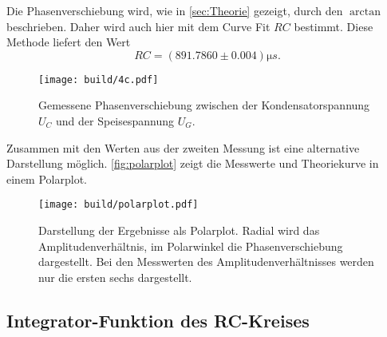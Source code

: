 Die Phasenverschiebung wird, wie in \autoref{sec:Theorie} gezeigt, durch den $\arctan$ beschrieben.
Daher wird auch hier mit dem Curve Fit $RC$ bestimmt. Diese Methode liefert den Wert
\begin{equation}
	RC = (891.7860 \pm 0.004) \si{\micro s}.
	\label{eqn:ergebniss-4c}
\end{equation}

\begin{figure}[H]
	\centering
	\texttt{[image: build/4c.pdf]}
	\caption{Gemessene Phasenverschiebung zwischen der Kondensatorspannung $U_C$ und der Speisespannung
	$U_G$.}
	\label{fig:4c.pdf}
\end{figure}

Zusammen mit den Werten aus der zweiten Messung ist eine alternative Darstellung möglich.
\autoref{fig:polarplot} zeigt die Messwerte und Theoriekurve in einem Polarplot.

\begin{figure}[H]
	\centering
	\texttt{[image: build/polarplot.pdf]}
	\caption{Darstellung der Ergebnisse als Polarplot. Radial wird das Amplitudenverhältnis,
		im Polarwinkel die Phasenverschiebung dargestellt. Bei den Messwerten des 
		Amplitudenverhältnisses werden nur die ersten sechs dargestellt.}
	\label{fig:polarplot}
\end{figure}

\subsection{Integrator-Funktion des RC-Kreises}
\label{sec:4d-auswertung}


